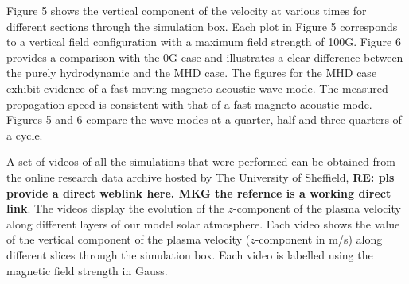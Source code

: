 \documentclass[physics,article,submit,pdftex,moreauthors]{Definitions/mdpi}
\begin{document}








 Figure 5 %
 shows the vertical component of the velocity at various times for different sections through the simulation box. Each plot in  Figure 5 %
 corresponds to a vertical field configuration with a maximum field strength of 100G. Figure 6 provides a comparison with the 0G case and %
 illustrates a clear difference between the purely hydrodynamic and the MHD case. The figures for the MHD case exhibit evidence of a fast moving magneto-acoustic wave mode. The measured propagation speed is consistent with that of a fast magneto-acoustic mode. Figures 5 and 6 compare the wave modes at a quarter, half and three-quarters of a cycle. 

 A set of videos of all the simulations that were performed can be obtained from the online research data archive hosted by The University of Sheffield, \citet{Griffiths2018a} {\bf RE: pls provide a direct weblink here. MKG the refernce is a working direct link}. The videos display the evolution of the $z$-component of the plasma velocity along different layers of our model solar atmosphere. Each video shows the value of the vertical component of the plasma velocity ($z$-component in m/s) along different slices through the simulation box. Each video is labelled using the magnetic field strength in Gauss. 
  
\end{document}
